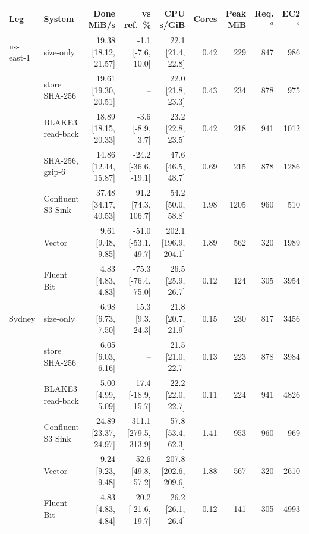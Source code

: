 
\begin{tabular}{@{}llrrrrrrr@{}}
\toprule
Leg & System & Done MiB/s & vs ref.\ \% & CPU s/GiB & Cores & Peak MiB & Req.$^a$ & EC2$^b$ \\
\midrule
us-east-1 & \sysname{} size-only & 19.38 [18.12, 21.57] & -1.1 [-7.6, 10.0] & 22.1 [21.4, 22.8] & 0.42 & 229 & 847 & 986 \\
 & \sysname{} store SHA-256 & 19.61 [19.30, 20.51] & -- & 22.0 [21.8, 23.3] & 0.43 & 234 & 878 & 975 \\
 & \sysname{} BLAKE3 read-back & 18.89 [18.15, 20.33] & -3.6 [-8.9, 3.7] & 23.2 [22.8, 23.5] & 0.42 & 218 & 941 & 1012 \\
 & \sysname{} SHA-256, gzip-6 & 14.86 [12.44, 15.87] & -24.2 [-36.6, -19.1] & 47.6 [46.5, 48.7] & 0.69 & 215 & 878 & 1286 \\
 & Confluent S3 Sink & 37.48 [34.17, 40.53] & 91.2 [74.3, 106.7] & 54.2 [50.0, 58.8] & 1.98 & 1205 & 960 & 510 \\
 & Vector & 9.61 [9.48, 9.85] & -51.0 [-53.1, -49.7] & 202.1 [196.9, 204.1] & 1.89 & 562 & 320 & 1989 \\
 & Fluent Bit & 4.83 [4.83, 4.83] & -75.3 [-76.4, -75.0] & 26.5 [25.9, 26.7] & 0.12 & 124 & 305 & 3954 \\
\addlinespace[1pt]
Sydney & \sysname{} size-only & 6.98 [6.73, 7.50] & 15.3 [9.3, 24.3] & 21.8 [20.7, 21.9] & 0.15 & 230 & 817 & 3456 \\
 & \sysname{} store SHA-256 & 6.05 [6.03, 6.16] & -- & 21.5 [21.0, 22.7] & 0.13 & 223 & 878 & 3984 \\
 & \sysname{} BLAKE3 read-back & 5.00 [4.99, 5.09] & -17.4 [-18.9, -15.7] & 22.2 [22.0, 22.7] & 0.11 & 224 & 941 & 4826 \\
 & Confluent S3 Sink & 24.89 [23.37, 24.97] & 311.1 [279.5, 313.9] & 57.8 [53.4, 62.3] & 1.41 & 953 & 960 & 969 \\
 & Vector & 9.24 [9.23, 9.48] & 52.6 [49.8, 57.2] & 207.8 [202.6, 209.6] & 1.88 & 567 & 320 & 2610 \\
 & Fluent Bit & 4.83 [4.83, 4.84] & -20.2 [-21.6, -19.7] & 26.2 [26.1, 26.4] & 0.12 & 141 & 305 & 4993 \\
\bottomrule
\end{tabular}
